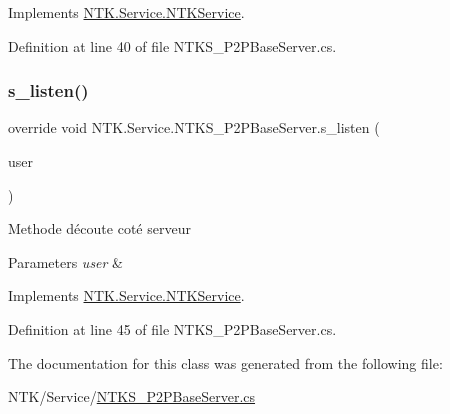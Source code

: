 Implements \mbox{\hyperlink{class_n_t_k_1_1_service_1_1_n_t_k_service_abab6261724876aea1ba1590720c2b994}{N\+T\+K.\+Service.\+N\+T\+K\+Service}}.



Definition at line 40 of file N\+T\+K\+S\+\_\+\+P2\+P\+Base\+Server.\+cs.

\mbox{\label{class_n_t_k_1_1_service_1_1_n_t_k_s___p2_p_base_server_a29d92f2728d0f824d443114a9b3715ba}} 
\subsubsection{\texorpdfstring{s\_listen()}{s\_listen()}}
{\footnotesize\ttfamily override void N\+T\+K.\+Service.\+N\+T\+K\+S\+\_\+\+P2\+P\+Base\+Server.\+s\+\_\+listen (\begin{DoxyParamCaption}\item[{\mbox{\hyperlink{class_n_t_k_1_1_n_t_k_user}{N\+T\+K\+User}}}]{user }\end{DoxyParamCaption})\hspace{0.3cm}{\ttfamily [virtual]}}



Methode d\textquotesingle{}écoute coté serveur 


\begin{DoxyParams}{Parameters}
{\em user} & \\
\hline
\end{DoxyParams}


Implements \mbox{\hyperlink{class_n_t_k_1_1_service_1_1_n_t_k_service_a7c7cb8c5ddc57bebe6d9784744c976d7}{N\+T\+K.\+Service.\+N\+T\+K\+Service}}.



Definition at line 45 of file N\+T\+K\+S\+\_\+\+P2\+P\+Base\+Server.\+cs.



The documentation for this class was generated from the following file\+:\begin{DoxyCompactItemize}
\item 
N\+T\+K/\+Service/\mbox{\hyperlink{_n_t_k_s___p2_p_base_server_8cs}{N\+T\+K\+S\+\_\+\+P2\+P\+Base\+Server.\+cs}}\end{DoxyCompactItemize}

